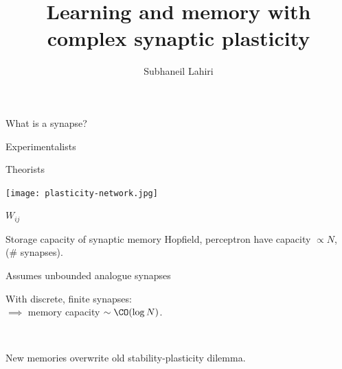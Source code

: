 \documentclass[final]{beamer}%
\title[Complex synapses]{Learning and memory with complex synaptic plasticity}
\author{Subhaneil Lahiri%
}
\institute[Stanford]{%
Stanford University, Applied Physics
}
\begin{document}

\begin{frame}
%
 \titlepage
%
\end{frame}


\begin{frame}{What is a synapse?}
%
 \begin{center}
 \parbox[c]{0.45\linewidth}{
  \begin{center}
    Experimentalists
  \end{center}
 }
 \parbox[c]{0.45\linewidth}{
  \begin{center}
    Theorists
  \end{center}
 }

 \parbox[c]{0.45\linewidth}{
  \begin{center}
    \texttt{[image: plasticity-network.jpg]}
  \end{center}
 }
 \parbox[c]{0.45\linewidth}{
  \begin{center}
    \Huge $W_{ij}$
  \end{center}
 }
 \end{center}
%
\end{frame}


\begin{frame}{Storage capacity of synaptic memory}
%
  Hopfield, perceptron have capacity $\propto N$, (\# synapses).

\vp\parbox[t]{0.59\linewidth}{%
  Assumes unbounded analogue synapses

 \vp With discrete, finite synapses:\\
 $\implies$ memory capacity  $\sim\CO(\log N)$.
 \\ 
 }
 \parbox[t]{0.4\linewidth}{
    \hfill{}
 }
 \\


 \vp New memories overwrite old
 \impl stability-plasticity dilemma.
%
\end{frame}
\end{document}
